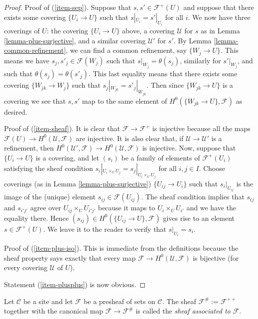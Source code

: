 \begin{proof}
Proof of (\ref{item-sep}).
Suppose that $s, s' \in \mathcal{F}^+(U)$ and suppose that
there exists some covering $\{U_i \to U\}$ such that
$s|_{U_i} = s'|_{U_i}$ for all $i$. We now have three coverings
of $U$: the covering $\{U_i \to U\}$ above, a covering $\mathcal{U}$
for $s$ as in Lemma \ref{lemma-plus-surjective},
and a similar covering $\mathcal{U}'$ for $s'$. By Lemma
\ref{lemma-common-refinement}, we can find a common refinement,
say $\{W_j \to U\}$. This means we have $s_j, s'_j \in \mathcal{F}(W_j)$
such that $s|_{W_j} = \theta(s_j)$, similarly for $s'|_{W_j}$, and
such that $\theta(s_j) = \theta(s'_j)$. This last equality means
that there exists some covering $\{W_{jk} \to W_j\}$ such that
$s_j|_{W_{jk}} = s'_j|_{W_{jk}}$. Then since $\{W_{jk} \to U\}$
is a covering we see that $s, s'$ map to the same element of
$H^0(\{W_{jk} \to U\}, \mathcal{F})$ as desired.

\medskip\noindent
Proof of (\ref{item-sheaf}). It is clear that $\mathcal{F} \to
\mathcal{F}^+$ is injective because all the maps
$\mathcal{F}(U) \to H^0(\mathcal{U}, \mathcal{F})$
are injective. It is also clear that, if $\mathcal{U} \to
\mathcal{U}'$ is a refinement, then $H^0(\mathcal{U}', \mathcal{F})
\to H^0(\mathcal{U}, \mathcal{F})$ is injective. Now,
suppose that $\{U_i \to U\}$ is a covering, and let
$(s_i)$ be a family of elements of $\mathcal{F}^+(U_i)$
satisfying the sheaf condition
$s_i|_{U_i \times_U U_j} = s_j|_{U_i \times_U U_j}$
for all $i, j \in I$. Choose coverings (as in
Lemma \ref{lemma-plus-surjective}) $\{U_{ij} \to U_i\}$
such that $s_i|_{U_{ij}}$ is the image of the (unique)
element $s_{ij} \in \mathcal{F}(U_{ij})$. The sheaf condition
implies that $s_{ij}$ and $s_{i'j'}$ agree over
$U_{ij} \times_U U_{i'j'}$ because it maps to
$U_i \times_U U_{i'}$ and we have the equality there.
Hence $(s_{ij}) \in H^0(\{U_{ij} \to U\}, \mathcal{F})$
gives rise to an element $s \in \mathcal{F}^+(U)$. We leave
it to the reader to verify that $s|_{U_i} = s_i$.

\medskip\noindent
Proof of (\ref{item-plus-iso}). This is immediate from the definitions
because the sheaf property says exactly that every map
$\mathcal{F} \to H^0(\mathcal{U}, \mathcal{F})$ is bijective
(for every covering $\mathcal{U}$ of $U$).

\medskip\noindent
Statement (\ref{item-plusplus}) is now obvious.
\end{proof}

\begin{definition}
\label{definition-associated-sheaf}
Let $\mathcal{C}$ be a site and let $\mathcal{F}$ be a presheaf
of sets on $\mathcal{C}$. The sheaf $\mathcal{F}^\# := \mathcal{F}^{++}$
together with the canonical map $\mathcal{F} \to \mathcal{F}^\#$
is called the {\it sheaf associated to $\mathcal{F}$}.
\end{definition}

